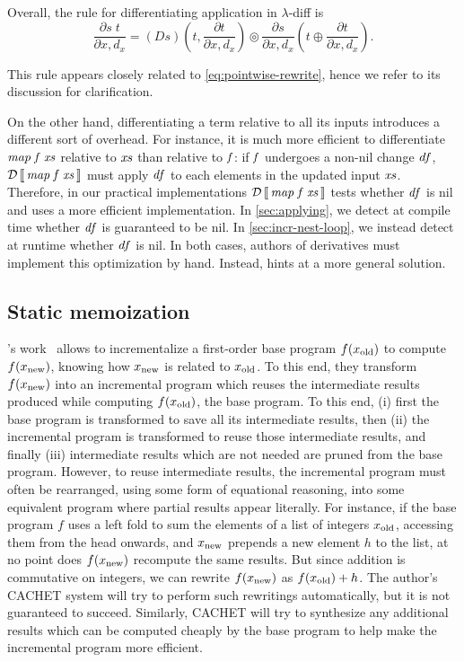 Overall, the rule for differentiating application in $\lambda$-diff is
\[
  \frac{\partial s\;t}{\partial x, d_x} = (D s)\left(t, \frac{\partial t}{\partial x,
d_x}\right) \circledcirc \frac{\partial s}{\partial x, d_x}\left(t \oplus \frac{\partial
t}{\partial x, d_x}\right).
  \]

This rule appears closely related to \cref{eq:pointwise-rewrite},
hence we refer to its discussion for clarification.

On the other hand, differentiating a term relative to all its
inputs introduces a different sort of overhead. For instance, it
is much more efficient to differentiate \ensuremath{\Varid{map}\;\Varid{f}\;\Varid{xs}} relative to
\ensuremath{\Varid{xs}} than relative to \ensuremath{\Varid{f}}: if \ensuremath{\Varid{f}} undergoes a non-nil change
\ensuremath{\Varid{df}}, \ensuremath{\Derive{\Varid{map}\;\Varid{f}\;\Varid{xs}}} must apply \ensuremath{\Varid{df}} to each elements in the
updated input \ensuremath{\Varid{xs}}. Therefore, in our practical implementations
\ensuremath{\Derive{\Varid{map}\;\Varid{f}\;\Varid{xs}}} tests whether \ensuremath{\Varid{df}} is nil and uses a more
efficient implementation. In \cref{sec:applying}, we detect at
compile time whether \ensuremath{\Varid{df}} is guaranteed to be nil. In
\cref{sec:incr-nest-loop}, we instead detect at runtime whether \ensuremath{\Varid{df}} is
nil. In both cases, authors of derivatives must implement this
optimization by hand. Instead, \ldiff{} hints at a more general
solution.

\subsection{Static memoization}
\label{ssec:staticmemo}
\citeauthor{Liu00}'s work~\citep{Liu00} allows to incrementalize a first-order base
program $f(x_{\textrm{old}})$ to compute $f(x_{\textrm{new}})$, knowing how
$x_{\textrm{new}}$ is related to $x_{\textrm{old}}$. To this end, they transform
$f(x_{\textrm{new}})$ into an incremental program which reuses the
intermediate results produced while computing $f(x_{\textrm{old}})$, the
base program. To this end, (i) first the base program is
transformed to save all its intermediate results, then (ii) the
incremental program is transformed to reuse those intermediate
results, and finally (iii) intermediate results which are not
needed are pruned from the base program. However, to reuse
intermediate results, the incremental program must often be
rearranged, using some form of equational reasoning, into some
equivalent program where partial results appear literally. For
instance, if the base program $f$ uses a left fold to sum the
elements of a list of integers $x_{\textrm{old}}$, accessing them from the
head onwards, and $x_{\textrm{new}}$ prepends a new element $h$ to the
list, at no point does $f(x_{\textrm{new}})$ recompute the same results.
But since addition is commutative on integers, we can rewrite
$f(x_{\textrm{new}})$ as $f(x_{\textrm{old}}) + h$. The author's CACHET system will
try to perform such rewritings automatically, but it is not
guaranteed to succeed. Similarly, CACHET will try to synthesize
any additional results which can be computed cheaply by the base
program to help make the incremental program more efficient.

